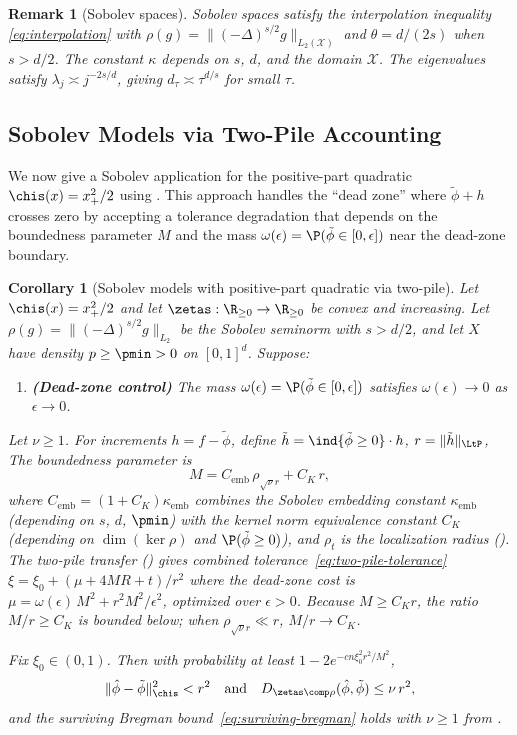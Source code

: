 \documentclass{article}
\newtheorem{corollary}[theorem]{Corollary}
\newtheorem{remark}{Remark}[section]
\begin{document}
\begin{remark}[Sobolev spaces]
\label{rmk:sobolev}
Sobolev spaces satisfy the interpolation inequality \eqref{eq:interpolation} with $\rho(g) = \|(-\Delta)^{s/2} g\|_{L_2(\mathcal{X})}$ and $\theta = d/(2s)$ when $s > d/2$. The constant $\kappa$ depends on $s$, $d$, and the domain $\mathcal{X}$. The eigenvalues satisfy $\lambda_j \asymp j^{-2s/d}$, giving $d_\tau \asymp \tau^{d/s}$ for small $\tau$.
\end{remark}

\subsection{Sobolev Models via Two-Pile Accounting}
\label{sec:sobolev-two-pile}

We now give a Sobolev application for the positive-part quadratic $\chis(x) = x_+^2/2$ using . This approach handles the ``dead zone'' where $\tilde\phi + h$ crosses zero by accepting a tolerance degradation that depends on the boundedness parameter $M$ and the mass $\omega(\epsilon) = \P(\tilde\phi \in [0,\epsilon])$ near the dead-zone boundary.

\begin{corollary}[Sobolev models with positive-part quadratic via two-pile]
\label{cor:sobolev-two-pile}
Let $\chis(x) = x_+^2/2$
and let $\zetas: \R_{\ge 0} \to \R_{\ge 0}$
be convex and increasing.
Let $\rho(g) = \|(-\Delta)^{s/2} g\|_{L_2}$
be the Sobolev seminorm with $s > d/2$,
and let $X$ have density $p \ge \pmin > 0$
on $[0,1]^d$.
Suppose:
\begin{enumerate}
\item[(i)] \textbf{(Dead-zone control)}
  The mass $\omega(\epsilon) = \P(\tilde\phi \in [0,\epsilon])$ satisfies $\omega(\epsilon) \to 0$ as $\epsilon \to 0$.
\end{enumerate}

Let $\nu \ge 1$.
For increments $h = f - \tilde\phi$,
define $\tilde h = \ind{\tilde\phi \ge 0} \cdot h$,
$r = \|\tilde h\|_{\LtP}$,
The boundedness parameter is
\[
M = C_{\mathrm{emb}}\, \rho_{\sqrt{\nu}r} + C_K\, r,
\]
where $C_{\mathrm{emb}} = (1 + C_K)\kappa_{\mathrm{emb}}$
combines the Sobolev embedding constant $\kappa_{\mathrm{emb}}$
(depending on $s$, $d$, $\pmin$)
with the kernel norm equivalence constant $C_K$
(depending on $\dim(\ker\rho)$ and $\P(\tilde\phi \ge 0)$),
and $\rho_t$ is the localization radius
().
The two-pile transfer () gives combined tolerance~\eqref{eq:two-pile-tolerance} $\xi = \xi_0 + (\mu + 4MR + t)/r^2$ where the dead-zone cost is $\mu = \omega(\epsilon)\, M^2 + r^2 M^2/\epsilon^2$, optimized over $\epsilon > 0$.
Because $M \ge C_K r$, the ratio $M/r \ge C_K$
is bounded below; when $\rho_{\sqrt{\nu}r} \ll r$,
$M/r \to C_K$.

Fix $\xi_0 \in (0,1)$.
Then with probability at least
$1 - 2e^{-c n \xi_0^2 r^2/M^2}$,
\[
\|\hat\phi - \tilde\phi\|_{\chis}^2 < r^2
\qqtext{and}
D_{\zetas \comp \rho}(\hat\phi, \tilde\phi) \le \nu\, r^2,
\]
and the surviving Bregman bound~\eqref{eq:surviving-bregman}
holds with $\nu \ge 1$ from .
\end{corollary}
\end{document}
